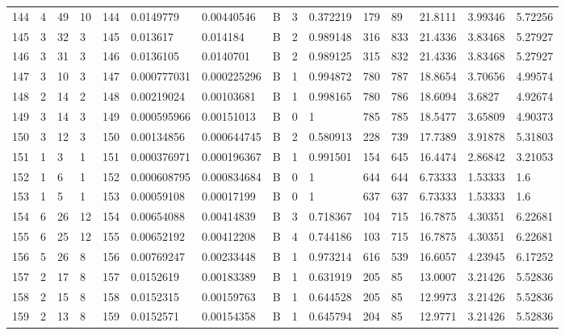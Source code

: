 \begin{latin}
\begin{longtable}{lllllllllllllll}
	144 & 4  & 49  & 10 & 144 & 0.0149779      & 0.00440546     & B & 3  & 0.372219 & 179  & 89   & 21.8111 & 3.99346 & 5.72256 \\
	145 & 3  & 32  & 3  & 145 & 0.013617       & 0.014184       & B & 2  & 0.989148 & 316  & 833  & 21.4336 & 3.83468 & 5.27927 \\
	146 & 3  & 31  & 3  & 146 & 0.0136105      & 0.0140701      & B & 2  & 0.989125 & 315  & 832  & 21.4336 & 3.83468 & 5.27927 \\
	147 & 3  & 10  & 3  & 147 & 0.000777031    & 0.000225296    & B & 1  & 0.994872 & 780  & 787  & 18.8654 & 3.70656 & 4.99574 \\
	148 & 2  & 14  & 2  & 148 & 0.00219024     & 0.00103681     & B & 1  & 0.998165 & 780  & 786  & 18.6094 & 3.6827  & 4.92674 \\
	149 & 3  & 14  & 3  & 149 & 0.000595966    & 0.00151013     & B & 0  & 1        & 785  & 785  & 18.5477 & 3.65809 & 4.90373 \\
	150 & 3  & 12  & 3  & 150 & 0.00134856     & 0.000644745    & B & 2  & 0.580913 & 228  & 739  & 17.7389 & 3.91878 & 5.31803 \\
	151 & 1  & 3   & 1  & 151 & 0.000376971    & 0.000196367    & B & 1  & 0.991501 & 154  & 645  & 16.4474 & 2.86842 & 3.21053 \\
	152 & 1  & 6   & 1  & 152 & 0.000608795    & 0.000834684    & B & 0  & 1        & 644  & 644  & 6.73333 & 1.53333 & 1.6     \\
	153 & 1  & 5   & 1  & 153 & 0.00059108     & 0.00017199     & B & 0  & 1        & 637  & 637  & 6.73333 & 1.53333 & 1.6     \\
	154 & 6  & 26  & 12 & 154 & 0.00654088     & 0.00414839     & B & 3  & 0.718367 & 104  & 715  & 16.7875 & 4.30351 & 6.22681 \\
	155 & 6  & 25  & 12 & 155 & 0.00652192     & 0.00412208     & B & 4  & 0.744186 & 103  & 715  & 16.7875 & 4.30351 & 6.22681 \\
	156 & 5  & 26  & 8  & 156 & 0.00769247     & 0.00233448     & B & 1  & 0.973214 & 616  & 539  & 16.6057 & 4.23945 & 6.17252 \\
	157 & 2  & 17  & 8  & 157 & 0.0152619      & 0.00183389     & B & 1  & 0.631919 & 205  & 85   & 13.0007 & 3.21426 & 5.52836 \\
	158 & 2  & 15  & 8  & 158 & 0.0152315      & 0.00159763     & B & 1  & 0.644528 & 205  & 85   & 12.9973 & 3.21426 & 5.52836 \\
	159 & 2  & 13  & 8  & 159 & 0.0152571      & 0.00154358     & B & 1  & 0.645794 & 204  & 85   & 12.9771 & 3.21426 & 5.52836 \\

\end{longtable}
\end{latin}

